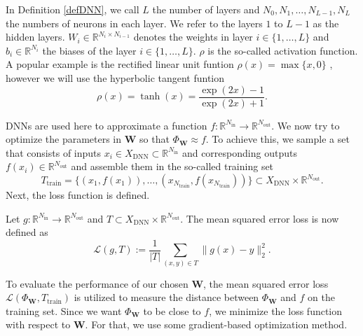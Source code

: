 In Definition \ref{defDNN}, we call $L$ the number of layers and $N_0,N_1,\dotsc,N_{L-1}, N_L$ the numbers of neurons in each layer. We refer to the layers $1$ to $L-1$ as the hidden layers. $W_i\in\mathbb{R}^{N_i\times N_{i-1}}$ denotes the weights in layer $i\in\{1,\dotsc,L\}$ and $b_i\in\mathbb{R}^{N_i}$ the biases of the layer $i\in\{1,\dotsc,L\}$. $\rho$ is the so-called activation function. A popular example is the rectified linear unit funtion $\rho(x)=\operatorname{max}\{x,0\}$ \cite{Elbrachter2022-ll}, however we will use the hyperbolic tangent funtion
\begin{displaymath}
\rho(x)=\tanh(x)=\frac{\exp(2x)-1}{\exp(2x)+1}.
\end{displaymath}

DNNs are used here to approximate a function $f:\mathbb{R}^{N_{\mathrm{in}}}\to\mathbb{R}^{N_{\mathrm{out}}}$. We now try to optimize the parameters in $\mathbf{W}$ so that $\Phi_\mathbf{W}\approx f$. To achieve this, we sample a set that consists of inputs $x_i\in X_\mathrm{DNN}\subset\mathbb{R}^{N_{\mathrm{in}}}$ and corresponding outputs $f(x_i)\in\mathbb{R}^{N_{\mathrm{out}}}$ and assemble them in the so-called training set
\begin{equation}
T_\mathrm{train}=\{(x_1,f(x_1)),\dotsc,(x_{N_\mathrm{train}},f(x_{N_\mathrm{train}}))\}\subset X_\mathrm{DNN}\times\mathbb{R}^{N_\mathrm{out}}.
\end{equation}
Next, the loss function is defined.
\begin{defn}
Let $g:\mathbb{R}^{N_{\mathrm{in}}}\to\mathbb{R}^{N_{\mathrm{out}}}$ and $T\subset X_\mathrm{DNN}\times\mathbb{R}^{N_\mathrm{out}}$. The mean squared error loss is now defined as
\begin{displaymath}
\mathscr{L}(g,T):=\frac{1}{|T|}\sum_{(x,y)\in T}\| g(x)-y\|_2^2.
\end{displaymath}
\end{defn}

To evaluate the performance of our chosen $\mathbf{W}$, the mean squared error loss $\mathscr{L}(\Phi_\mathbf{W},T_\mathrm{train})$ is utilized to measure the distance between $\Phi_\mathbf{W}$ and $f$ on the training set. Since we want $\Phi_\mathbf{W}$ to be close to $f$, we minimize the loss function with respect to $\mathbf{W}$. For that, we use some gradient-based optimization method.%

